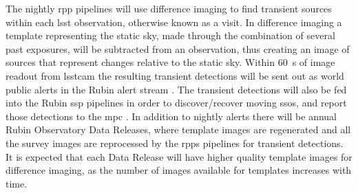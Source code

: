 \documentclass[preprintm,linenumbers]{aastex631}
\begin{document}
	The nightly \gls*{rpp} pipelines will use difference imaging to find transient sources within each \gls*{lsst} observation, otherwise known as a visit. 
 In difference imaging a template representing the static sky, made through the combination of several past exposures, will be subtracted from an observation, thus creating an image of sources that represent changes relative to the static sky. 
 Within 60\ s of image readout from \gls*{lsstcam} the resulting transient detections will be sent out as world public alerts in the Rubin alert stream \citep{lsstSRD, 2019ApJ...873..111I, LDM-612, LSE-163, RTN-011}. 
 The transient detections will also be fed into the Rubin \gls*{ssp} pipelines in order to discover/recover moving \glspl*{sso}, and report those detections to the \gls*{mpc}  \citep{2019ApJ...873..111I,lsstMOPS,lsstSSP}. 
In addition to nightly alerts there will be annual Rubin Observatory Data Releases, where template images are regenerated and all the survey images are reprocessed by the \glspl*{rpp} pipelines for transient detections.
It is expected that each Data Release will have higher quality template images for difference imaging, as the number of images available for templates increases with time.
 
\end{document}
